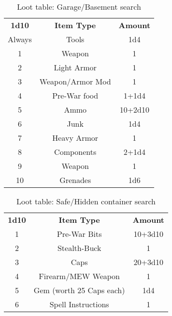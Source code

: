 \documentclass[11pt,a4paper,twocolumn]{book}
\begin{document}
       \begin{table}
        \centering
        \caption{Loot table: Garage/Basement search}
        \begin{tabular}{|c|c|c|}
           \hline
           \textbf{1d10}    & \textbf{Item Type}    & \textbf{Amount}  \\ 
                    Always  &  Tools                & 1d4               \\
                    1       & Weapon                & 1           \\
                    2       & Light Armor           & 1        \\
                    3       & Weapon/Armor Mod      & 1          \\ 
                    4       & Pre-War food          & 1+1d4          \\    
                    5       & Ammo                  & 10+2d10         \\
                    6       & Junk                  & 1d4          \\  
                    7       & Heavy Armor           & 1           \\  
                    8       & Components            & 2+1d4          \\
                    9       & Weapon                & 1           \\
                    10      & Grenades              & 1d6   \\ \hline
        \end{tabular}
        \label{tab:my_label}
    \end{table}
    
        \begin{table}
        \centering
        \caption{Loot table: Safe/Hidden container search}
        \begin{tabular}{|c|c|c|}
           \hline
           \textbf{1d10}    & \textbf{Item Type}    & \textbf{Amount}  \\ 
                    1       &  Pre-War Bits         & 10+3d10           \\
                    2       &  Stealth-Buck         &  1         \\
                    3       &  Caps                 & 20+3d10          \\ 
                    4       &  Firearm/MEW Weapon   & 1           \\    
                    5       &  Gem (worth 25 Caps each)  & 1d4         \\
                    6       &  Spell Instructions   & 1          \\  \hline
        \end{tabular}
        \label{tab:my_label}
    \end{table}
\end{document}
